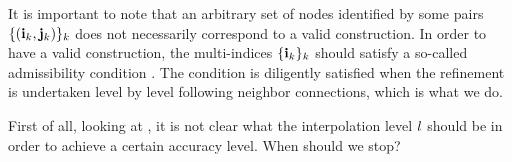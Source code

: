 \begin{remark}
It is important to note that an arbitrary set of nodes identified by some pairs
$\{ (\mathbf{i}_k, \mathbf{j}_k) \}_k$ does not necessarily correspond to a valid
construction. In order to have a valid construction, the multi-indices $\{ \mathbf{i}_k
\}_k$ should satisfy a so-called admissibility condition \cite{klimke2006}. The
condition is diligently satisfied when the refinement is undertaken level by
level following neighbor connections, which is what we do.
\end{remark}

First of all, looking at , it is not clear what the
interpolation level $l$ should be in order to achieve a certain accuracy level.
When should we stop?
